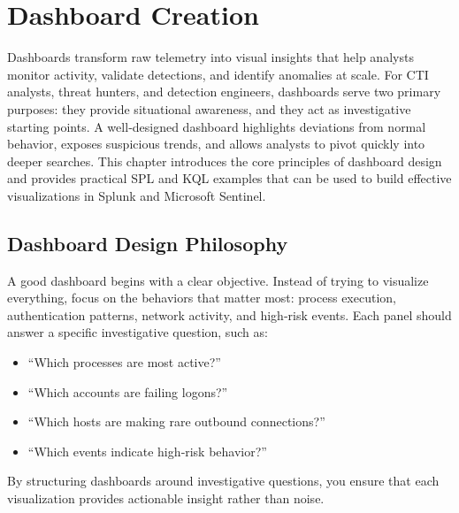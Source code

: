 \section{Dashboard Creation}

Dashboards transform raw telemetry into visual insights that help analysts monitor activity, validate detections, 
and identify anomalies at scale. For CTI analysts, threat hunters, and detection engineers, dashboards serve two 
primary purposes: they provide situational awareness, and they act as investigative starting points. A well‑designed 
dashboard highlights deviations from normal behavior, exposes suspicious trends, and allows analysts to pivot quickly 
into deeper searches. This chapter introduces the core principles of dashboard design and provides practical SPL and 
KQL examples that can be used to build effective visualizations in Splunk and Microsoft Sentinel.


\subsection*{Dashboard Design Philosophy}

A good dashboard begins with a clear objective. Instead of trying to visualize everything, focus on the behaviors 
that matter most: process execution, authentication patterns, network activity, and high‑risk events. Each panel 
should answer a specific investigative question, such as:

\begin{itemize}
    \item “Which processes are most active?”
    \item “Which accounts are failing logons?”
    \item “Which hosts are making rare outbound connections?”
    \item “Which events indicate high‑risk behavior?”
\end{itemize}

By structuring dashboards around investigative questions, you ensure that each visualization provides actionable 
insight rather than noise.



